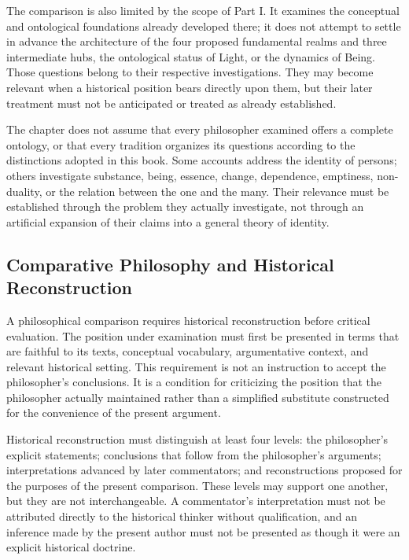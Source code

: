 \label{para:VS.B01.P01.C08.S01.SS01.P003}
The comparison is also limited by the scope of Part I. It
examines the conceptual and ontological foundations already
developed there; it does not attempt to settle in advance the
architecture of the four proposed fundamental realms and three
intermediate hubs, the ontological status of Light, or the
dynamics of Being. Those questions belong to their respective
investigations. They may become relevant when a historical
position bears directly upon them, but their later treatment
must not be anticipated or treated as already established.

\label{para:VS.B01.P01.C08.S01.SS01.P004}
The chapter does not assume that every philosopher examined
offers a complete ontology, or that every tradition organizes
its questions according to the distinctions adopted in this
book. Some accounts address the identity of persons; others
investigate substance, being, essence, change, dependence,
emptiness, non-duality, or the relation between the one and the
many. Their relevance must be established through the problem
they actually investigate, not through an artificial expansion
of their claims into a general theory of identity.

\subsection{Comparative Philosophy and Historical Reconstruction}
\label{sec:ch08-s01-ss02}

\label{para:VS.B01.P01.C08.S01.SS02.P001}
A philosophical comparison requires historical reconstruction
before critical evaluation. The position under examination must
first be presented in terms that are faithful to its texts,
conceptual vocabulary, argumentative context, and relevant
historical setting. This requirement is not an instruction to
accept the philosopher's conclusions. It is a condition for
criticizing the position that the philosopher actually
maintained rather than a simplified substitute constructed for
the convenience of the present argument.

\label{para:VS.B01.P01.C08.S01.SS02.P002}
Historical reconstruction must distinguish at least four
levels: the philosopher's explicit statements; conclusions
that follow from the philosopher's arguments; interpretations
advanced by later commentators; and reconstructions proposed
for the purposes of the present comparison. These levels may
support one another, but they are not interchangeable. A
commentator's interpretation must not be attributed directly
to the historical thinker without qualification, and an
inference made by the present author must not be presented as
though it were an explicit historical doctrine.

